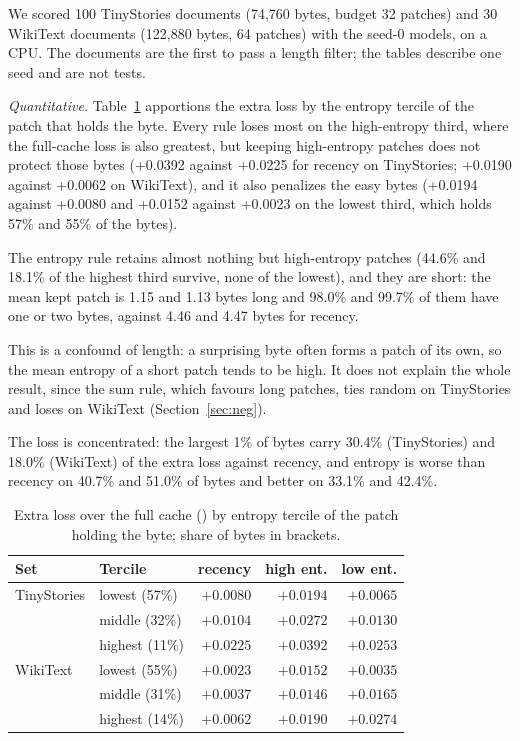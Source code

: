 We scored 100 TinyStories documents (74,760 bytes, budget 32 patches) and 30 WikiText documents (122,880 bytes, 64 patches) with the seed-0 models, on a CPU. The documents are the first to pass a length filter; the tables describe one seed and are not tests.

\textit{Quantitative.} Table~\ref{tab:terc} apportions the extra loss by the entropy tercile of the patch that holds the byte. Every rule loses most on the high-entropy third, where the full-cache loss is also greatest, but keeping high-entropy patches does not protect those bytes (+0.0392 against +0.0225 for recency on TinyStories; +0.0190 against +0.0062 on WikiText), and it also penalizes the easy bytes (+0.0194 against +0.0080 and +0.0152 against +0.0023 on the lowest third, which holds 57\% and 55\% of the bytes).

The entropy rule retains almost nothing but high-entropy patches (44.6\% and 18.1\% of the highest third survive, none of the lowest), and they are short: the mean kept patch is 1.15 and 1.13 bytes long and 98.0\% and 99.7\% of them have one or two bytes, against 4.46 and 4.47 bytes for recency.

This is a confound of length: a surprising byte often forms a patch of its own, so the mean entropy of a short patch tends to be high. It does not explain the whole result, since the sum rule, which favours long patches, ties random on TinyStories and loses on WikiText (Section~\ref{sec:neg}).

The loss is concentrated: the largest 1\% of bytes carry 30.4\% (TinyStories) and 18.0\% (WikiText) of the extra loss against recency, and entropy is worse than recency on 40.7\% and 51.0\% of bytes and better on 33.1\% and 42.4\%.

\begin{table}[t]
\centering\footnotesize
\caption{Extra loss over the full cache (\bpb) by entropy tercile of the patch holding the byte; share of bytes in brackets.}\label{tab:terc}
\begin{tabular}{@{}llrrr@{}}
\toprule
Set & Tercile & recency & high ent. & low ent.\\
\midrule
TinyStories & lowest (57\%) & $+0.0080$ & $+0.0194$ & $+0.0065$\\
 & middle (32\%) & $+0.0104$ & $+0.0272$ & $+0.0130$\\
 & highest (11\%) & $+0.0225$ & $+0.0392$ & $+0.0253$\\
WikiText & lowest (55\%) & $+0.0023$ & $+0.0152$ & $+0.0035$\\
 & middle (31\%) & $+0.0037$ & $+0.0146$ & $+0.0165$\\
 & highest (14\%) & $+0.0062$ & $+0.0190$ & $+0.0274$\\
\bottomrule
\end{tabular}
\end{table}


